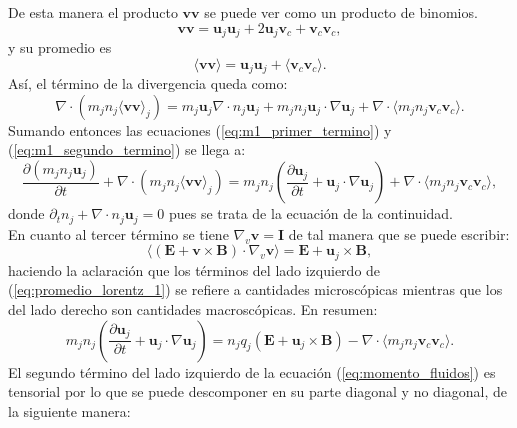 \documentclass[../tesis_main_file.tex]{subfiles}
\begin{document}
De esta manera el producto $\textbf{v}\textbf{v}$ se puede ver como un producto de binomios.
\begin{equation}
\textbf{v}\textbf{v}=\textbf{u}_j \textbf{u}_j + 2\textbf{u}_j \textbf{v}_c + \textbf{v}_c \textbf{v}_c,
\end{equation}
y su promedio es
\begin{equation}
\langle \textbf{v} \textbf{v} \rangle = \textbf{u}_j \textbf{u}_j +\langle \textbf{v}_c \textbf{v}_c \rangle.
\end{equation}
Así, el término de la divergencia queda como:
\begin{equation}
\label{eq:m1_segundo_termino}
\nabla \cdot (m_jn_j\langle \textbf{v}\textbf{v} \rangle_j)=m_j \textbf{u}_j\nabla \cdot n_j \textbf{u}_j+m_jn_j\textbf{u}_j\cdot \nabla \textbf{u}_j+\nabla \cdot \langle m_jn_j \textbf{v}_c \textbf{v}_c \rangle.
\end{equation}
Sumando entonces las ecuaciones (\ref{eq:m1_primer_termino}) y (\ref{eq:m1_segundo_termino}) se llega a:
\begin{equation}
\frac{\partial (m_jn_j\textbf{u}_j)}{\partial t}+\nabla \cdot (m_jn_j\langle \textbf{v}\textbf{v} \rangle_j)=m_jn_j \left( \frac{\partial \textbf{u}_j}{\partial t}+\textbf{u}_j\cdot \nabla \textbf{u}_j \right)+ \nabla \cdot \langle m_jn_j \textbf{v}_c \textbf{v}_c \rangle,
\end{equation}
donde $\partial_t n_j+\nabla \cdot n_j \textbf{u}_j=0$ pues se trata de la ecuación de la continuidad.\\
En cuanto al tercer término se tiene $\nabla _v \textbf{v}=\textbf{I}$ de tal manera que se puede escribir:
\begin{equation}
    \label{eq:promedio_lorentz_1}
    \langle (\textbf{E}+\textbf{v}\times \textbf{B})\cdot \nabla_v\textbf{v}\rangle = \textbf{E}+\textbf{u}_j\times \textbf{B},
\end{equation}
haciendo la aclaración que los términos del lado izquierdo de (\ref{eq:promedio_lorentz_1}) se refiere a cantidades microscópicas mientras que los del lado derecho son cantidades macroscópicas.
En resumen:
\begin{equation}
\label{eq:momento_fluidos}
m_jn_j \left( \frac{\partial \textbf{u}_j}{\partial t}+\textbf{u}_j\cdot \nabla \textbf{u}_j \right)= n_jq_j(\textbf{E}+\textbf{u}_j\times \textbf{B})- \nabla \cdot \langle m_jn_j \textbf{v}_c \textbf{v}_c \rangle.
\end{equation}
El segundo término del lado izquierdo de la ecuación (\ref{eq:momento_fluidos}) es tensorial por lo que se puede descomponer en su parte diagonal y no diagonal, de la siguiente manera:
\end{document}
